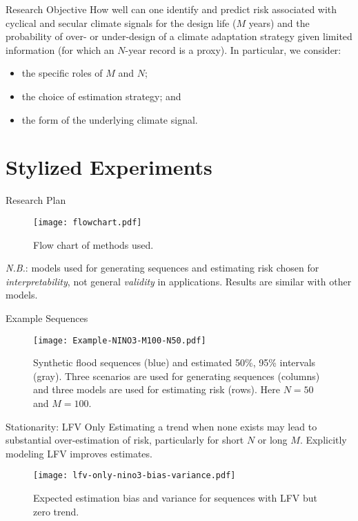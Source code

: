 \documentclass[
  10pt,     %
  handout   %
]{beamer}
\begin{document}
\begin{frame}{Research Objective}
  How well can one identify and predict risk associated with cyclical and secular climate signals for the design life ($M$ years) and the probability of over- or under-design of a climate adaptation strategy given limited information (for which an $N$-year record is a proxy).
  In particular, we consider:
  \begin{itemize}
    \item the specific roles of $M$ and $N$;
    \item the choice of estimation strategy; and
    \item the form of the underlying climate signal.
  \end{itemize}
\end{frame}

\section{Stylized Experiments}

\begin{frame}{Research Plan}
  \begin{figure}
    \centering
    \texttt{[image: flowchart.pdf]}
    \caption{Flow chart of methods used.}
  \end{figure}
  \pause
  \emph{N.B.}: models used for generating sequences and estimating risk chosen for \emph{interpretability}, not general \emph{validity} in applications.
  Results are similar with other models.
\end{frame}

\begin{frame}{Example Sequences}
  \begin{figure}
    \centering
    \texttt{[image: Example-NINO3-M100-N50.pdf]}
    \caption{
      Synthetic flood sequences (blue) and estimated 50\%, 95\% intervals (gray).
      Three scenarios are used for generating sequences (columns) and three models are used for estimating risk (rows).
      Here $N=50$ and $M=100$.
    }
  \end{figure}
\end{frame}

\begin{frame}{Stationarity: LFV Only}
  Estimating a trend when none exists may lead to substantial over-estimation of risk, particularly for short $N$ or long $M$.
  Explicitly modeling LFV improves estimates.
  \begin{figure}
    \centering
    \texttt{[image: lfv-only-nino3-bias-variance.pdf]}
    \caption{
      Expected estimation bias and variance for sequences with LFV but zero trend.
    }\label{fig:lfv-nino3-bias-variance}
  \end{figure}
\end{frame}
\end{document}
